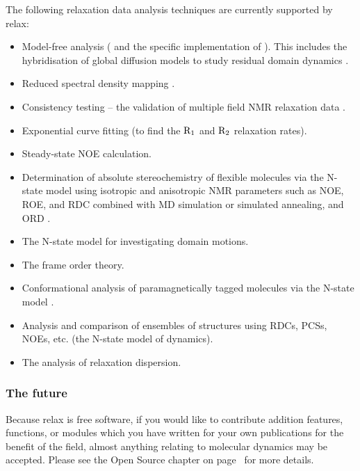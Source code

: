 The following relaxation data analysis techniques are currently supported by relax:
\begin{itemize}
  \item Model-free analysis (\citet{LipariSzabo82a, LipariSzabo82b, Clore90a} and the specific implementation of \citet{dAuvergneGooley03,dAuvergneGooley06,dAuvergneGooley07,dAuvergneGooley08a,dAuvergneGooley08b}).
    This includes the hybridisation of global diffusion models to study residual domain dynamics \citep{Horne07}.
  \item Reduced spectral density mapping \citep{Farrow95, Lefevre96}.
  \item Consistency testing -- the validation of multiple field NMR relaxation data \citep{MorinGagne09a,Fushman99}.
  \item Exponential curve fitting (to find the $\mathrm{R}_1$ and $\mathrm{R}_2$ relaxation rates).
  \item Steady-state NOE calculation.
  \item Determination of absolute stereochemistry of flexible molecules via the N-state model using isotropic and anisotropic NMR parameters such as NOE, ROE, and RDC combined with MD simulation or simulated annealing, and ORD \citep{Sun11}.
  \item The N-state model for investigating domain motions.
  \item The frame order theory.
  \item Conformational analysis of paramagnetically tagged molecules via the N-state model \citep{Erdelyi11}.
  \item Analysis and comparison of ensembles of structures using RDCs, PCSs, NOEs, etc. (the N-state model of dynamics).
  \item The analysis of relaxation dispersion.
\end{itemize}


\subsubsection{The future}

Because relax is free software, if you would like to contribute addition features, functions, or modules which you have written for your own publications for the benefit of the field, almost anything relating to molecular dynamics may be accepted.
Please see the Open Source chapter on page~\pageref{ch: open source} for more details.




